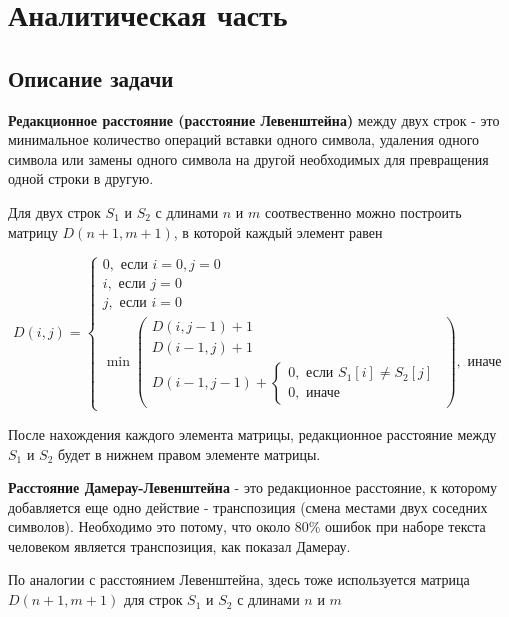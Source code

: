 \documentclass[a4paper,12pt]{article}
\begin{document}
\newpage
\section{Аналитическая часть}

\subsection{Описание задачи}

\textbf{Редакционное расстояние (расстояние Левенштейна)}
между двух строк - это
минимальное количество операций вставки одного символа, удаления одного
символа или замены одного символа на другой необходимых для превращения
одной строки в другую.

Для двух строк $S_1$ и $S_2$ с длинами $n$ и $m$ соотвественно можно
построить матрицу $D(n+1, m+1)$, в которой каждый элемент равен

\begin{equation}
D(i,j) =
\begin{cases}
    0, \text{ если } i = 0, j = 0 \\
    i, \text{ если } j = 0 \\
    j, \text{ если } i = 0 \\
    \min
    \left(
        \begin{matrix}
            D(i, j - 1) + 1 \\
            D(i - 1, j) + 1 \\
            D(i - 1, j - 1) +
            \begin{cases}
                0, \text{ если } S_1[i] \ne S_2[j] \\
                0, \text{ иначе}
            \end{cases}
        \end{matrix}
    \right)
    , \text{ иначе}
\end{cases}
\end{equation}

После нахождения каждого элемента матрицы, редакционное расстояние между
$S_1$ и $S_2$ будет в нижнем правом элементе матрицы.

\textbf{Расстояние Дамерау-Левенштейна} - это редакционное расстояние,
к которому добавляется еще одно действие - транспозиция (смена местами
двух соседних символов). Необходимо это потому, что около 80\% ошибок
при наборе текста человеком является транспозиция, как показал Дамерау.

По аналогии с расстоянием Левенштейна, здесь тоже используется матрица
$D(n+1, m+1)$ для строк $S_1$ и $S_2$ с длинами $n$ и $m$
\end{document}
